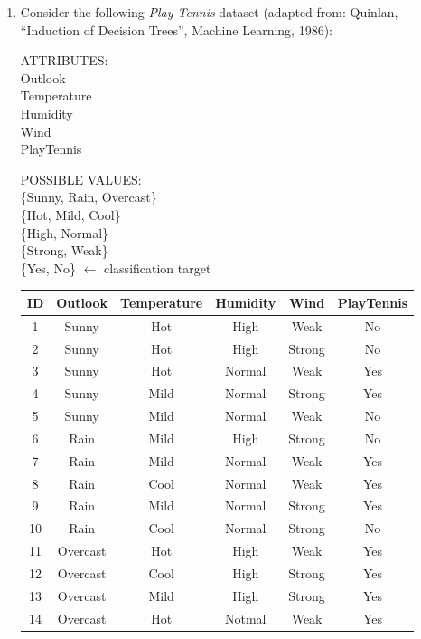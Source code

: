\documentclass[10pt]{article}
\begin{document}
\begin{enumerate}
\item Consider the following \textit{Play Tennis} dataset (adapted from: Quinlan, ``Induction of Decision Trees'', Machine Learning, 1986): \\
  \begin{center}
    \begin{minipage}[c]{0.4\linewidth}
      ATTRIBUTES: \\
      Outlook \\
      Temperature \\
      Humidity \\
      Wind \\
      PlayTennis \\
    \end{minipage}
    \begin{minipage}[c]{0.4\linewidth}
      POSSIBLE VALUES: \\
      \{Sunny, Rain, Overcast\} \\
      \{Hot, Mild, Cool\} \\
      \{High, Normal\} \\
      \{Strong, Weak\} \\
      \{Yes, No\} \hspace{1cm} $\leftarrow$ classification target \\
    \end{minipage}
    \newline
    \begin{tabular}{|c|c|c|c|c|c|}
      \hline
      ID & \textbf{Outlook} & \textbf{Temperature} & \textbf{Humidity} & \textbf{Wind} & \textbf{PlayTennis} \\
      \hline
      1 & Sunny & Hot & High & Weak & No \\
      \hline
      2 & Sunny & Hot & High & Strong & No \\
      \hline
      3 & Sunny & Hot & Normal & Weak & Yes \\
      \hline
      4 & Sunny & Mild & Normal & Strong & Yes \\
      \hline
      5 & Sunny & Mild & Normal & Weak & No \\
      \hline
      6 & Rain & Mild & High & Strong & No \\
      \hline
      7 & Rain & Mild & Normal & Weak & Yes \\
      \hline
      8 & Rain & Cool & Normal & Weak & Yes \\
      \hline
      9 & Rain & Mild & Normal & Strong & Yes \\
      \hline
      10 & Rain & Cool & Normal & Strong & No \\
      \hline
      11 & Overcast & Hot & High & Weak & Yes \\
      \hline
      12 & Overcast & Cool & High & Strong & Yes \\
      \hline
      13 & Overcast & Mild & High & Strong & Yes \\
      \hline
      14 & Overcast & Hot & Notmal & Weak & Yes \\
      \hline
      

\end{tabular}
\end{center}
\end{enumerate}
\end{document}
